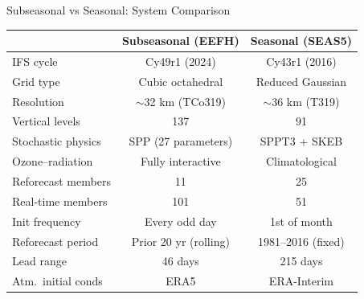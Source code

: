 \documentclass[aspectratio=169]{beamer}
\begin{document}
\begin{frame}{Subseasonal vs Seasonal: System Comparison}

    \centering
    \vspace{-0.3em}

    \footnotesize
    \renewcommand{\arraystretch}{1.4}
    \begin{tabular}{l c c}
    \toprule
     & \textbf{Subseasonal (EEFH)} & \textbf{Seasonal (SEAS5)} \\
    \midrule
    IFS cycle            & Cy49r1 (2024)       & Cy43r1 (2016) \\
    Grid type            & Cubic octahedral     & Reduced Gaussian \\
    Resolution           & $\sim$32 km (TCo319) & $\sim$36 km (T319) \\
    Vertical levels      & 137                  & 91 \\
    Stochastic physics   & SPP (27 parameters)  & SPPT3 + SKEB \\
    Ozone--radiation     & Fully interactive    & Climatological \\
    Reforecast members   & 11                   & 25 \\
    Real-time members    & 101                  & 51 \\
    Init frequency       & Every odd day        & 1st of month \\
    Reforecast period    & Prior 20 yr (rolling) & 1981--2016 (fixed) \\
    Lead range           & 46 days              & 215 days \\
    Atm.\ initial conds  & ERA5                 & ERA-Interim \\
    \bottomrule
    \end{tabular}

    \vspace{0.8em}
    \scriptsize

\end{frame}
\end{document}

